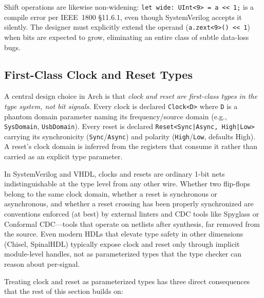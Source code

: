 \documentclass[manuscript]{acmart}
\begin{document}
Shift operations are likewise non-widening: \texttt{let wide: UInt<9> = a << 1;} is a compile error per IEEE~1800 §11.6.1, even though SystemVerilog accepts it silently. The designer must explicitly extend the operand (\texttt{a.zext<9>() << 1}) when bits are expected to grow, eliminating an entire class of subtle data-loss bugs.

\subsection{First-Class Clock and Reset Types}
\label{sec:clockreset}

A central design choice in Arch is that \emph{clock and reset are first-class types in the type system, not bit signals}. Every clock is declared \texttt{Clock<D>} where \texttt{D} is a phantom domain parameter naming its frequency/source domain (e.g., \texttt{SysDomain}, \texttt{UsbDomain}). Every reset is declared \texttt{Reset<Sync|Async, High|Low>} carrying its synchronicity (\texttt{Sync}/\texttt{Async}) and polarity (\texttt{High}/\texttt{Low}, defaults High). A reset's clock domain is inferred from the registers that consume it rather than carried as an explicit type parameter.

In SystemVerilog and VHDL, clocks and resets are ordinary 1-bit nets indistinguishable at the type level from any other wire. Whether two flip-flops belong to the same clock domain, whether a reset is synchronous or asynchronous, and whether a reset crossing has been properly synchronized are conventions enforced (at best) by external linters and CDC tools like Spyglass or Conformal CDC---tools that operate on netlists after synthesis, far removed from the source. Even modern HDLs that elevate type safety in other dimensions (Chisel, SpinalHDL) typically expose clock and reset only through implicit module-level handles, not as parameterized types that the type checker can reason about per-signal.

Treating clock and reset as parameterized types has three direct consequences that the rest of this section builds on:
\end{document}
